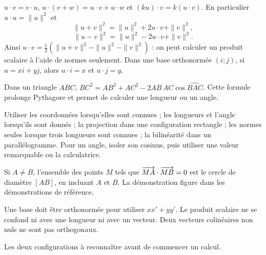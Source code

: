 \clearpage
{}
\begin{propriete}
$u\cdot v=v\cdot u$, $u\cdot(v+w)=u\cdot v+u\cdot w$ et
$(ku)\cdot v=k(u\cdot v)$. En particulier $u\cdot u=\|u\|^2$ et
\[\|u+v\|^2=\|u\|^2+2u\cdot v+\|v\|^2,\]
\[\|u-v\|^2=\|u\|^2-2u\cdot v+\|v\|^2.\]
Ainsi $u\cdot v=\frac12\left(\|u+v\|^2-\|u\|^2-\|v\|^2\right)$ : on peut calculer
un produit scalaire à l'aide de normes seulement.
Dans une base orthonormée $(i;j)$, si $u=xi+yj$, alors $u\cdot i=x$ et $u\cdot j=y$.
\end{propriete}
\begin{theoreme}[Al-Kashi]
Dans un triangle $ABC$, $BC^2=AB^2+AC^2-2AB\,AC\cos\widehat{BAC}$.
Cette formule prolonge Pythagore et permet de calculer une longueur ou un angle.
\end{theoreme}
\begin{savoirfaire}
Utiliser les coordonnées lorsqu'elles sont connues ; les longueurs et l'angle
lorsqu'ils sont donnés ; la projection dans une configuration rectangle ;
les normes seules lorsque trois longueurs sont connues ;
la bilinéarité dans un parallélogramme. Pour un angle, isoler son cosinus,
puis utiliser une valeur remarquable ou la calculatrice.
\end{savoirfaire}
\begin{propriete}
Si $A\neq B$, l'ensemble des points $M$ tels que
$\overrightarrow{MA}\cdot\overrightarrow{MB}=0$ est le cercle de diamètre $[AB]$,
en incluant $A$ et $B$. La démonstration figure dans les démonstrations de référence.
\end{propriete}
\begin{attention}
Une base doit être orthonormée pour utiliser $xx'+yy'$.
Le produit scalaire ne se confond ni avec une longueur ni avec un vecteur.
Deux vecteurs colinéaires non nuls ne sont pas orthogonaux.
\end{attention}


\clearpage
{}
Les deux configurations à reconnaître avant de commencer un calcul.
\vspace{5mm}
\vspace{5mm}
\exercices

